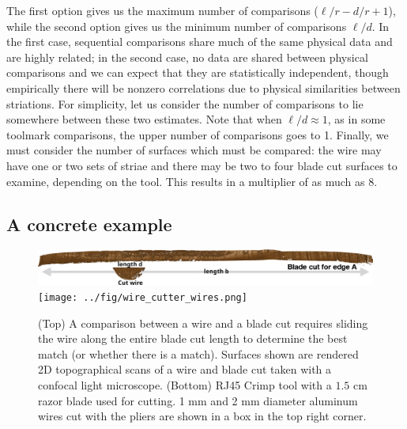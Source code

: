 \documentclass[9pt,twocolumn,twoside]{pnas-new}\usepackage[]{graphicx}\usepackage[dvipsnames]{xcolor}
\begin{document}
The first option gives us the maximum number of comparisons ($\ell/r - d/r + 1$), while the second option gives us the minimum number of comparisons $\ell/d$.
In the first case, sequential comparisons share much of the same physical data and are highly related; in the second case, no data are shared between physical comparisons and we can expect that they are statistically independent, though empirically there will be nonzero correlations due to physical similarities between striations.
For simplicity, let us consider the number of comparisons to lie somewhere between these two estimates.
Note that when $\ell/d \approx 1$, as in some toolmark comparisons, the upper number of comparisons goes to 1.
Finally, we must consider the number of surfaces which must be compared: the wire may have one or two sets of striae and there may be  two to four blade cut surfaces to examine, depending on the tool.
This results in a multiplier of as much as 8.

\subsection*{A concrete example}



\begin{figure}[t!]
\centering
\includegraphics[width=\columnwidth]{../fig/wire-blade-comparison-label.png}
\texttt{[image: ../fig/wire\_cutter\_wires.png]}
\caption{(Top) A comparison between a wire and a blade cut requires sliding the wire along the entire blade cut length to determine the best match (or whether there is a match). Surfaces shown are rendered 2D topographical scans of a wire and blade cut taken with a confocal light microscope. (Bottom) RJ45 Crimp tool with a $1.5$ cm razor blade used for cutting. 1 mm and 2 mm diameter aluminum wires cut with the pliers are shown in a box in the top right corner.}\label{fig:tool-pic}\label{fig:wire-blade}
\end{figure}
\end{document}
